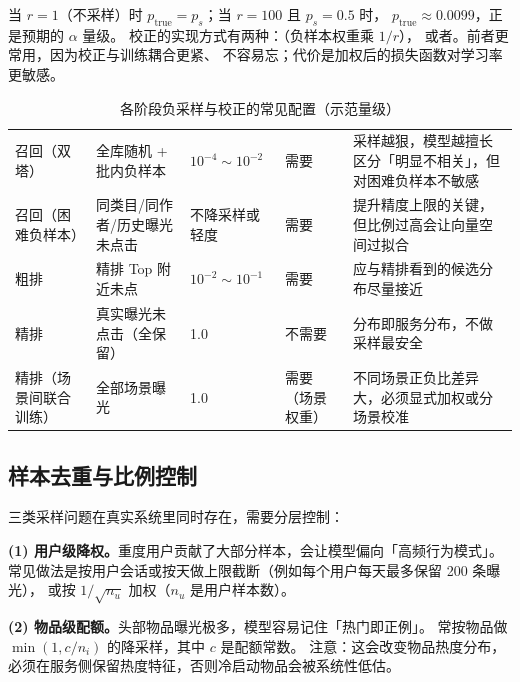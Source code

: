 当 $r=1$（不采样）时 $p_{\text{true}} = p_s$；当 $r=100$ 且 $p_s=0.5$ 时，
$p_{\text{true}} \approx 0.0099$，正是预期的 $\alpha$ 量级。
校正的实现方式有两种：（负样本权重乘 $1/r$），
或者。前者更常用，因为校正与训练耦合更紧、
不容易忘；代价是加权后的损失函数对学习率更敏感。

\begin{table}[htbp]
\centering
\caption{各阶段负采样与校正的常见配置（示范量级）}
\label{tab:sample-neg}
\small
\begin{tabularx}{\textwidth}{L{2.1cm} L{2.0cm} L{1.8cm} L{1.6cm} Y}
\toprule
{} &  &  &  &  \\
\midrule
召回（双塔） & 全库随机 + 批内负样本 & $10^{-4} \sim 10^{-2}$ & 需要 & 采样越狠，模型越擅长区分「明显不相关」，但对困难负样本不敏感 \\
\addlinespace
召回（困难负样本） & 同类目/同作者/历史曝光未点击 & 不降采样或轻度 & 需要 & 提升精度上限的关键，但比例过高会让向量空间过拟合 \\
\addlinespace
粗排 & 精排 Top 附近未点 & $10^{-2} \sim 10^{-1}$ & 需要 & 应与精排看到的候选分布尽量接近 \\
\addlinespace
精排 & 真实曝光未点击（全保留） & 1.0 & 不需要 & 分布即服务分布，不做采样最安全 \\
\addlinespace
精排（场景间联合训练） & 全部场景曝光 & 1.0 & 需要（场景权重） & 不同场景正负比差异大，必须显式加权或分场景校准 \\
\bottomrule
\end{tabularx}
\end{table}

\subsection{样本去重与比例控制}

三类采样问题在真实系统里同时存在，需要分层控制：

\textbf{(1) 用户级降权。}重度用户贡献了大部分样本，会让模型偏向「高频行为模式」。
常见做法是按用户会话或按天做上限截断（例如每个用户每天最多保留 200 条曝光），
或按 $1/\sqrt{n_u}$ 加权（$n_u$ 是用户样本数）。

\textbf{(2) 物品级配额。}头部物品曝光极多，模型容易记住「热门即正例」。
常按物品做 $\min(1, c / n_i)$ 的降采样，其中 $c$ 是配额常数。
注意：这会改变物品热度分布，必须在服务侧保留热度特征，否则冷启动物品会被系统性低估。

